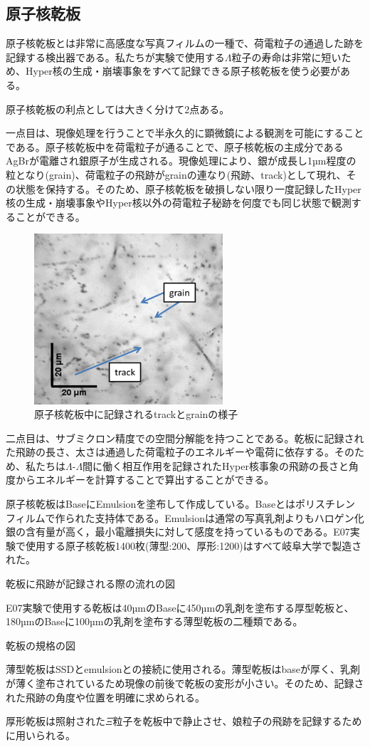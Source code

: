 \documentclass[12pt,a4paper]{jarticle}
\begin{document}
\subsection{原子核乾板}
原子核乾板とは非常に高感度な写真フィルムの一種で、荷電粒子の通過した跡を記録する検出器である。私たちが実験で使用する$\Lambda$粒子の寿命は非常に短いため、Hyper核の生成・崩壊事象をすべて記録できる原子核乾板を使う必要がある。\par
原子核乾板の利点としては大きく分けて2点ある。\par
一点目は、現像処理を行うことで半永久的に顕微鏡による観測を可能にすることである。原子核乾板中を荷電粒子が通ることで、原子核乾板の主成分であるAgBrが電離され銀原子が生成される。現像処理により、銀が成長し1µm程度の粒となり(grain)、荷電粒子の飛跡がgrainの連なり(飛跡、track)として現れ、その状態を保持する。そのため、原子核乾板を破損しない限り一度記録したHyper核の生成・崩壊事象やHyper核以外の荷電粒子秘跡を何度でも同じ状態で観測することができる。\par
\begin{figure}[htbp]
 \begin{center}
  \includegraphics[width=70mm]{grainfog.png}
 \end{center}
 \caption{原子核乾板中に記録されるtrackとgrainの様子}
\end{figure}
二点目は、サブミクロン精度での空間分解能を持つことである。乾板に記録された飛跡の長さ、太さは通過した荷電粒子のエネルギーや電荷に依存する。そのため、私たちは$\Lambda$-$\Lambda$間に働く相互作用を記録されたHyper核事象の飛跡の長さと角度からエネルギーを計算することで算出することができる。\par
原子核乾板はBaseにEmulsionを塗布して作成している。Baseとはポリスチレンフィルムで作られた支持体である。Emulsionは通常の写真乳剤よりもハロゲン化銀の含有量が高く，最小電離損失に対して感度を持っているものである。E07実験で使用する原子核乾板1400枚(薄型:200、厚形:1200)はすべて岐阜大学で製造された。\par
乾板に飛跡が記録される際の流れの図\par
E07実験で使用する乾板は40µmのBaseに450µmの乳剤を塗布する厚型乾板と、180µmのBaseに100µmの乳剤を塗布する薄型乾板の二種類である。\par
乾板の規格の図\par
薄型乾板はSSDとemulsionとの接続に使用される。薄型乾板はbaseが厚く、乳剤が薄く塗布されているため現像の前後で乾板の変形が小さい。そのため、記録された飛跡の角度や位置を明確に求められる。\par
厚形乾板は照射された$\Xi$粒子を乾板中で静止させ、娘粒子の飛跡を記録するために用いられる。
\end{document}
